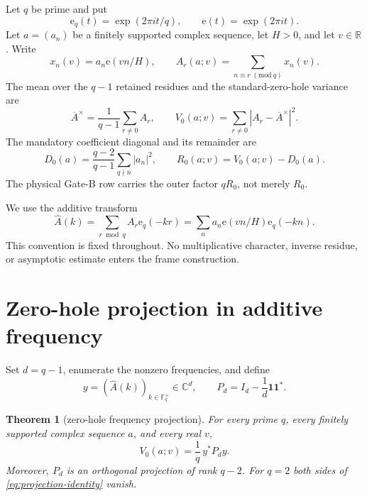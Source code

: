 \documentclass[11pt]{article}
\newtheorem{theorem}{Theorem}[section]
\newcommand{\Fq}{\mathbb F_q}
\newcommand{\C}{\mathbb C}
\newcommand{\e}{\mathrm e}
\newcommand{\one}{\mathbf 1}
\begin{document}
Let $q$ be prime and put
\[
 \e_q(t)=\exp(2\pi i t/q),\qquad \e(t)=\exp(2\pi i t).
\]
Let $a=(a_n)$ be a finitely supported complex sequence, let $H>0$, and let
$v\in\mathbb R$.  Write
\begin{equation}\label{eq:residue-row}
 x_n(v)=a_n\e(vn/H),\qquad
 A_r(a;v)=\sum_{n\equiv r\; (\mathrm{mod}\ q)}x_n(v).
\end{equation}
The mean over the $q-1$ retained residues and the standard-zero-hole variance
are
\begin{equation}\label{eq:zero-hole-variance}
 \overline A^{\times}=\frac1{q-1}\sum_{r\ne0}A_r,
 \qquad
 V_0(a;v)=\sum_{r\ne0}|A_r-\overline A^{\times}|^2.
\end{equation}
The mandatory coefficient diagonal and its remainder are
\begin{equation}\label{eq:diagonal-remainder}
 D_0(a)=\frac{q-2}{q-1}\sum_{q\nmid n}|a_n|^2,
 \qquad R_0(a;v)=V_0(a;v)-D_0(a).
\end{equation}
The physical Gate-B row carries the outer factor $qR_0$, not merely $R_0$.

We use the additive transform
\begin{equation}\label{eq:dft}
 \widehat A(k)=\sum_{r\bmod q}A_r\e_q(-kr)
 =\sum_n a_n\e(vn/H)\e_q(-kn).
\end{equation}
This convention is fixed throughout.  No multiplicative character, inverse
residue, or asymptotic estimate enters the frame construction.

\section{Zero-hole projection in additive frequency}

Set $d=q-1$, enumerate the nonzero frequencies, and define
\begin{equation}\label{eq:projection}
 y=(\widehat A(k))_{k\in\Fq^\times}\in\C^d,
 \qquad P_d=I_d-\frac1d\one\one^*.
\end{equation}

\begin{theorem}[zero-hole frequency projection]\label{thm:projection}
For every prime $q$, every finitely supported complex sequence $a$, and every
real $v$,
\begin{equation}\label{eq:projection-identity}
 \boxed{V_0(a;v)=\frac1q\,y^*P_dy.}
\end{equation}
Moreover, $P_d$ is an orthogonal projection of rank $q-2$.  For $q=2$ both
sides of \eqref{eq:projection-identity} vanish.
\end{theorem}
\end{document}
